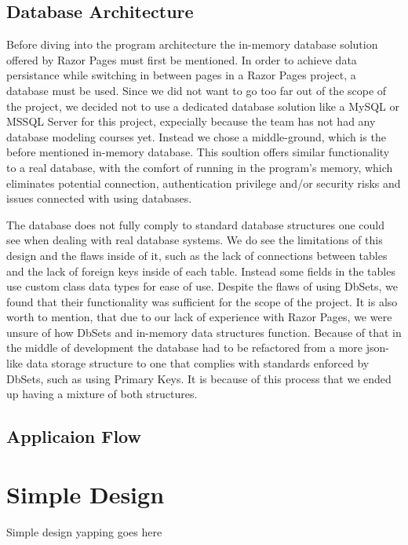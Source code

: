 \documentclass[12pt]{report}
\begin{document}
\subsection*{Database Architecture}
Before diving into the program architecture the in-memory database solution offered by Razor Pages must first be mentioned.
In order to achieve data persistance while switching in between pages in a Razor Pages project, a database must be used. 
Since we did not want to go too far out of the scope of the project, we decided not to use a dedicated database solution
like a MySQL or MSSQL Server for this project, expecially because the team has not had any database modeling courses
yet. Instead we chose a middle-ground, which is the before mentioned in-memory database. This soultion offers similar functionality
to a real database, with the comfort of running in the program's memory, which eliminates potential connection, authentication
privilege and/or security risks and issues connected with using databases.

The database does not fully comply to standard database structures one could see when dealing with real database systems. 
We do see the limitations of this design and the flaws inside of it, such as the lack of connections between tables and the 
lack of foreign keys inside of each table. Instead some fields in the tables use custom class data types for ease of use. Despite the flaws
of using DbSets, we found that their functionality was sufficient for the scope of the project. It is also worth to mention, that due
to our lack of experience with Razor Pages, we were unsure of how DbSets and in-memory data structures function. Because of that in the
middle of development the database had to be refactored from a more json-like data storage structure to one that complies
with standards enforced by DbSets, such as using Primary Keys. It is because of this process that we ended up having a mixture of both structures.

\subsection*{Applicaion Flow}


\section{Simple Design}
Simple design yapping goes here

\end{document}
